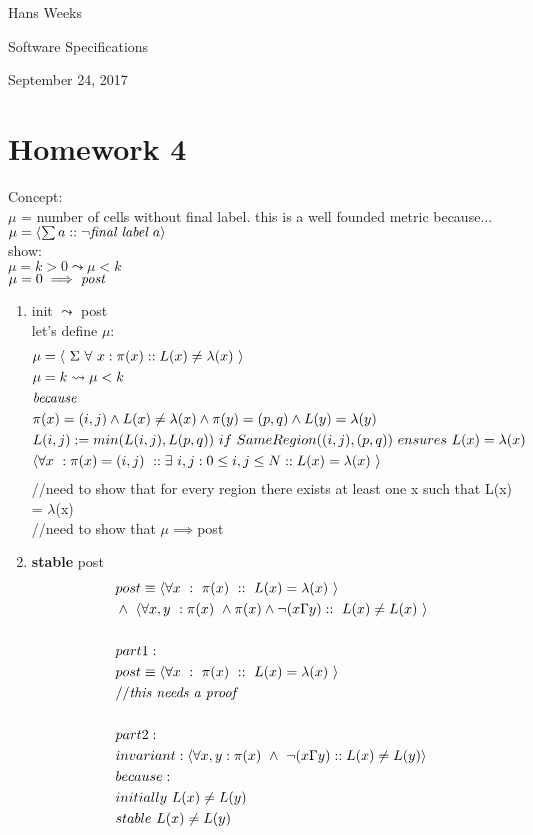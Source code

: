 \documentclass{article}
\begin{document}
\hfill Hans Weeks

\hfill Software Specifications

\hfill September 24, 2017
\section*{Homework 4}
Concept:\\ $\mu$ = number of cells without final label. this is a well founded metric because...\\
$\mu = \langle \sum a :: \neg \emph{final label } a \rangle$\\
show:\\
$\mu=k>0 \leadsto \mu<k$\\
$\mu=0\implies \emph{post}$\\
\begin{enumerate}
\item
init $\leadsto$ post\\
let's define $\mu$:
\begin{align*}
&\mu = \langle \ \Sigma \ \forall \ x : \pi(x) :: L(x) \neq \lambda(x) \ \rangle\\
&\mu = k \leadsto \mu < k\\
&\emph{because}\\
&\pi(x)=(i,j) \wedge L(x)\neq \lambda(x) \wedge \pi(y)=(p,q) \wedge L(y)=\lambda(y)\\
&L(i,j) := min(L(i,j),L(p,q)) \ if \ SameRegion((i,j),(p,q)) \ ensures \ L(x)=\lambda(x)\\
&\langle \forall x \ : \pi(x)=(i,j) \ :: \exists \ i,j : 0 \leq i,j \leq N :: L(x)=\lambda(x) \ \rangle\\
\end{align*}
//need to show that for every region there exists at least one x such that L(x) = $\lambda$(x)\\
//need to show that $\mu\implies$post
\newpage
\item
\textbf{stable} post\\
\begin{align*}
&post \equiv \langle \forall x \ : \ \pi(x) \ :: \ L(x) = \lambda(x) \ \rangle\\
&\wedge \ \langle \forall x,y \ : \pi(x) \ \wedge \pi(x) \wedge \neg(x \Gamma y) :: \ L(x) \neq L(x)  \ \rangle\\
\\
&part 1:\\
&post \equiv \langle \forall x \ : \ \pi(x) \ :: \ L(x) = \lambda(x) \ \rangle\\
&//\emph{this needs a proof}\\
\\
&part 2:\\
&invariant: \langle \forall x,y : \pi(x) \ \wedge \ \neg(x\Gamma y) :: L(x)\neq L(y) \rangle\\
&because:\\
&initially \ L(x) \neq L(y)\\
&stable \ L(x) \neq L(y)\\
\end{align*}
\end{enumerate}
\end{document}
